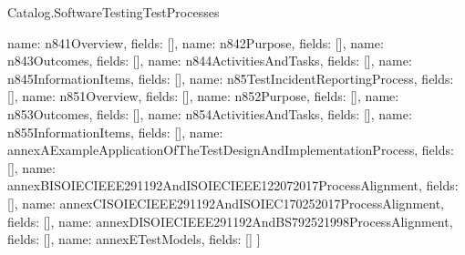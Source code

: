 \begin{lexlean}{Catalog.SoftwareTestingTestProcesses}
\begin{semanticmodule}
{    {name: n841Overview, fields: []},
    {name: n842Purpose, fields: []},
    {name: n843Outcomes, fields: []},
    {name: n844ActivitiesAndTasks, fields: []},
    {name: n845InformationItems, fields: []},
    {name: n85TestIncidentReportingProcess, fields: []},
    {name: n851Overview, fields: []},
    {name: n852Purpose, fields: []},
    {name: n853Outcomes, fields: []},
    {name: n854ActivitiesAndTasks, fields: []},
    {name: n855InformationItems, fields: []},
    {name: annexAExampleApplicationOfTheTestDesignAndImplementationProcess, fields: []},
    {name: annexBISOIECIEEE291192AndISOIECIEEE122072017ProcessAlignment, fields: []},
    {name: annexCISOIECIEEE291192AndISOIEC170252017ProcessAlignment, fields: []},
    {name: annexDISOIECIEEE291192AndBS792521998ProcessAlignment, fields: []},
    {name: annexETestModels, fields: []}
  ]
}


\end{semanticmodule}
\end{lexlean}
